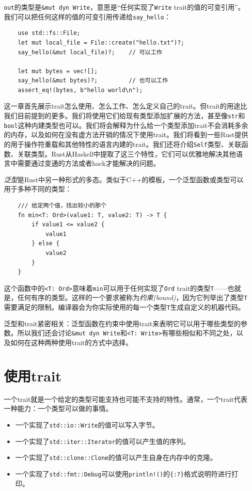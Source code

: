 \texttt{out}的类型是\texttt{\&mut dyn Write}，意思是“任何实现了\texttt{Write} trait的值的可变引用”。我们可以把任何这样的值的可变引用传递给\texttt{say\_hello}：
\begin{verbatim}
    use std::fs::File;
    let mut local_file = File::create("hello.txt")?;
    say_hello(&mut local_file)?;    // 可以工作

    let mut bytes = vec![];
    say_hello(&mut bytes)?;         // 也可以工作
    assert_eq!(bytes, b"hello world\n");
\end{verbatim}

这一章首先展示trait怎么使用、怎么工作、怎么定义自己的trait。但trait的用途比我们目前提到的更多。我们将使用它们给现有类型添加扩展的方法，甚至像\texttt{str}和\texttt{bool}这种内建类型也可以。我们将会解释为什么给一个类型添加trait不会消耗多余的内存，以及如何在没有虚方法开销的情况下使用trait。我们将看到一些Rust提供的用于操作符重载和其他特性的语言内建的trait。我们还将介绍\texttt{Self}类型、关联函数、关联类型。Rust从Haskell中提取了这三个特性，它们可以优雅地解决其他语言中需要通过变通的方法或者hack才能解决的问题。 

\emph{泛型}是Rust中另一种形式的多态。类似于C++的模板，一个泛型函数或类型可以用于多种不同的类型：
\begin{verbatim}
    /// 给定两个值，找出较小的那个
    fn min<T: Ord>(value1: T, value2: T) -> T {
        if value1 <= value2 {
            value1
        } else {
            value2
        }
    }
\end{verbatim}

这个函数中的\texttt{<T: Ord>}意味着\texttt{min}可以用于任何实现了\texttt{Ord} trait的类型\texttt{T}——也就是，任何有序的类型。这样的一个要求被称为\emph{约束(bound)}，因为它列举出了类型\texttt{T}需要满足的限制。编译器会为你实际使用的每一个类型\texttt{T}生成自定义的机器代码。

泛型和trait紧密相关：泛型函数在约束中使用trait来表明它可以用于哪些类型的参数。所以我们还会讨论\texttt{\&mut dyn Write}和\texttt{<T: Write>}有哪些相似和不同之处，以及如何在这种两种使用trait的方式中选择。

\section{使用trait}

一个trait就是一个给定的类型可能支持也可能不支持的特性。通常，一个trait代表一种能力：一个类型可以做的事情。
\begin{itemize}
    \item 一个实现了\texttt{std::io::Write}的值可以写入字节。
    \item 一个实现了\texttt{std::iter::Iterator}的值可以产生值的序列。
    \item 一个实现了\texttt{std::clone::Clone}的值可以产生自身在内存中的克隆。
    \item 一个实现了\texttt{std::fmt::Debug}可以使用\texttt{println!()}的\texttt{\{:?\}}格式说明符进行打印。
\end{itemize}


